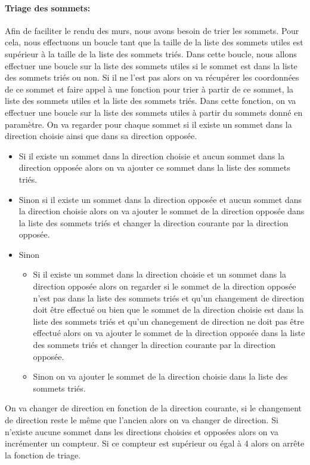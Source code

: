 \documentclass[11pt]{article}
\begin{document}
\paragraph{Triage des sommets:}
Afin de faciliter le rendu des murs, nous avons besoin de trier les sommets. Pour cela, nous effectuons un boucle tant que la taille de la liste des sommets utiles est supérieur à la taille de la liste des sommets triés. Dans cette boucle, nous allons effectuer une boucle sur la liste des sommets utiles si le sommet est dans la liste des sommets triés ou non. Si il ne l'est pas alors on va récupérer les coordonnées de ce sommet et faire appel à une fonction pour trier à partir de ce sommet, la liste des sommets utiles et la liste des sommets triés. Dans cette fonction, on va effectuer une boucle sur la liste des sommets utiles à partir du sommets donné en paramètre. On va regarder pour chaque sommet si il existe un sommet dans la direction choisie ainsi que dans sa direction opposée. %
\begin{itemize}
	\item Si il existe un sommet dans la direction choisie et aucun sommet dans la direction opposée alors on va ajouter ce sommet dans la liste des sommets triés.
	\item Sinon si il existe un sommet dans la direction opposée et aucun sommet dans la direction choisie alors on va ajouter le sommet de la direction opposée dans la liste des sommets triés et changer la direction courante par la direction opposée.
	\item Sinon
	\begin{itemize}
		\item Si il existe un sommet dans la direction choisie et un sommet dans la direction opposée alors on regarder si le sommet de la direction opposée n'est pas dans la liste des sommets triés et qu'un changement de direction doit être effectué ou bien que le sommet de la direction choisie est dans la liste des sommets triés et qu'un chanegement de direction ne doit pas être effectué alors on va ajouter le sommet de la direction opposée dans la liste des sommets triés et changer la direction courante par la direction opposée.
		\item Sinon on va ajouter le sommet de la direction choisie dans la liste des sommets triés.
	\end{itemize}
\end{itemize}
On va changer de direction en fonction de la direction courante, si le changement de direction reste le même que l'ancien alors on va changer de direction. Si n'existe aucune sommet dans les directions choisies et opposées alors on va incrémenter un compteur. Si ce compteur est supérieur ou égal à 4 alors on arrête la fonction de triage.
\end{document}
